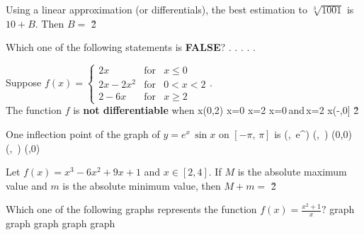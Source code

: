 \documentclass[amsfonts,bezier,leqno,fleqn,12pt,a4paper]{article}
\begin{document}
{{{{\begin{large}
\newpage



\item %
Using a linear approximation (or differentials), the best estimation to $\sqrt[3]{1001}$ is $10+B.$ Then $B=$
\sc
\be
\displaystyle {}
\ee
\be
\displaystyle {}
\ee
\be
\displaystyle {}
\ee
\be
\displaystyle {}
\ee
\be
\displaystyle {}
\ee
\v2



\item %
Which one of the following statements is \textbf{FALSE}?
\sc
\be
.
\ee
\be
.
\ee
\be
.
\ee
\be
.
\ee
\be
.
\ee

\newpage



\item %
Suppose $f(x)= \left\{\begin{array}{lll} 2x & \mbox{for} & x\leq 0 \\ \displaystyle 2x-2x^2 & \mbox{for} & 0 < x <2\\ 2-6x & \mbox{for} & x\geq 2 \end{array}\right.$.\\ The function $f$ is \textbf{not differentiable} when
\sc
\be
x\in(0,2)
\ee
\be
x=0
\ee
\be
x=2
\ee
\be
x=0\,\mbox{and}\,x=2
\ee
\be
x\in(-\infty,0]
\ee
\v2



\item %
One inflection point of the graph of $y=e^x\,\sin x$ on $[-\pi,\,\pi]$ is
\sc
\be
\displaystyle \left(,\, e^{}\right)
\ee
\be
\displaystyle \left(,\, \right)
\ee
\be
(0,0)
\ee
\be
\displaystyle \left(,\, \right)
\ee
\be
(\pi,0)
\ee

\newpage



\item %
Let $f(x)=x^3-6x^2+9x+1$ and $x\in[2,4].$ If $M$ is the absolute maximum value and $m$ is the absolute minimum value, then $M+m=$
\sc
{}
\ee
{}
\ee
{}
\ee
{}
\ee
{}
\ee
\v2



\item %
Which one of the following graphs represents the function $\displaystyle f(x)=\frac{x^{2}+1}{x}?$
\sc
\be
\mbox{graph}
\ee
\be
\mbox{graph}
\ee
\be
\mbox{graph}
\ee
\be
\mbox{graph}
\ee
\be
\mbox{graph}
\ee


\end{large}}}}}
\end{document}
